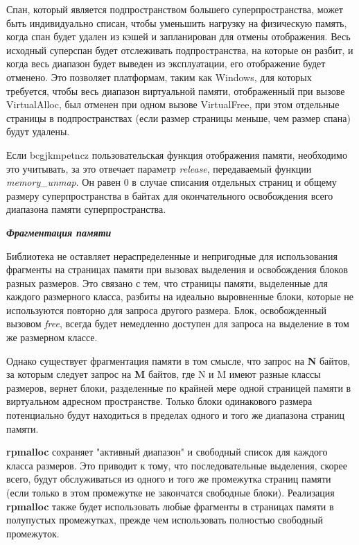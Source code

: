 Спан, который является подпространством большего суперпространства, может быть индивидуально списан, чтобы уменьшить нагрузку на физическую память, когда спан будет удален из кэшей и запланирован для отмены отображения. Весь исходный суперспан будет отслеживать подпространства, на которые он разбит, и когда весь диапазон будет выведен из эксплуатации, его отображение будет отменено. Это позволяет платформам, таким как Windows, для которых требуется, чтобы весь диапазон виртуальной памяти, отображенный при вызове VirtualAlloc, был отменен при одном вызове VirtualFree, при этом отдельные страницы в подпространствах (если размер страницы меньше, чем размер спана) будут удалены.

Если bcgjkmpetncz пользовательская функция отображения памяти, необходимо это учитывать, за это отвечает параметр \textit{release}, передаваемый функции \textit{memory\_unmap}. Он равен 0 в случае списания отдельных страниц и общему размеру суперпространства в байтах для окончательного освобождения всего диапазона памяти суперпространства.

\bigbreak
\textit{\textbf{Фрагментация памяти}}

Библиотека не оставляет нераспределенные и непригодные для использования фрагменты на страницах памяти при вызовах выделения и освобождения блоков разных размеров. Это связано с тем, что страницы памяти, выделенные для каждого размерного класса, разбиты на идеально выровненные блоки, которые не используются повторно для запроса другого размера. Блок, освобожденный вызовом \textit{free}, всегда будет немедленно доступен для запроса на выделение в том же размерном классе.

Однако существует фрагментация памяти в том смысле, что запрос на \textbf{N} байтов, за которым следует запрос на \textbf{M} байтов, где N и M имеют разные классы размеров, вернет блоки, разделенные по крайней мере одной страницей памяти в виртуальном адресном пространстве. Только блоки одинакового размера потенциально будут находиться в пределах одного и того же диапазона страниц памяти.

\textbf{rpmalloc} сохраняет "активный диапазон" и свободный список для каждого класса размеров. Это приводит к тому, что последовательные выделения, скорее всего, будут обслуживаться из одного и того же промежутка страниц памяти (если только в этом промежутке не закончатся свободные блоки). Реализация \textbf{rpmalloc} также будет использовать любые фрагменты в страницах памяти в полупустых промежутках, прежде чем использовать полностью свободный промежуток.

